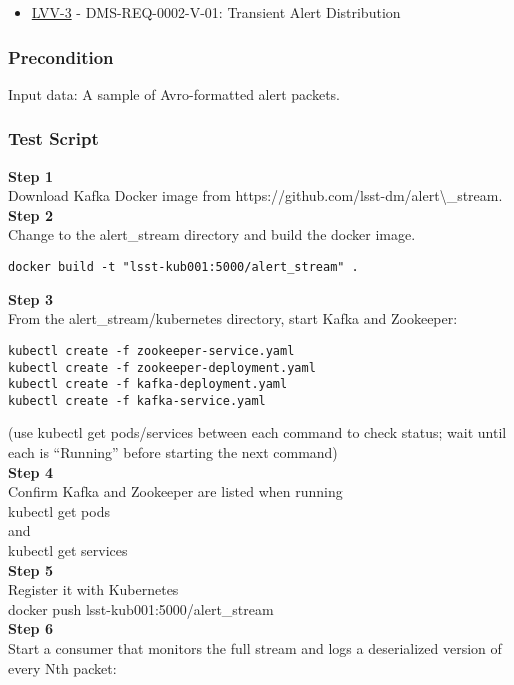 \begin{itemize}
\tightlist
\item
  \href{https://jira.lsstcorp.org/browse/LVV-3}{LVV-3} -
  DMS-REQ-0002-V-01: Transient Alert Distribution
\end{itemize}

\subsubsection{Precondition}\label{precondition-6}

Input data: A sample of Avro-formatted alert packets.

\subsubsection{Test Script}\label{test-script-7}

\textbf{Step 1}\\
Download Kafka Docker image from
https://github.com/lsst-dm/alert\textbackslash{}\_stream.\\[2\baselineskip]\textbf{Step
2}\\
Change to the alert\_stream directory and build the docker image.\\

\begin{verbatim}
docker build -t "lsst-kub001:5000/alert_stream" .
\end{verbatim}

\textbf{Step 3}\\
From the alert\_stream/kubernetes directory, start Kafka and
Zookeeper:\\[2\baselineskip]

\begin{verbatim}
kubectl create -f zookeeper-service.yaml
kubectl create -f zookeeper-deployment.yaml
kubectl create -f kafka-deployment.yaml
kubectl create -f kafka-service.yaml
\end{verbatim}

(use kubectl get pods/services between each command to check status;
wait until each is ``Running'' before starting the next
command)\\[4\baselineskip]\textbf{Step 4}\\
Confirm Kafka and Zookeeper are listed when
running\\[2\baselineskip]kubectl get
pods\\[2\baselineskip]and\\[2\baselineskip]kubectl get
services\\[2\baselineskip]\textbf{Step 5}\\
Register it with Kubernetes\\[2\baselineskip]docker push
lsst-kub001:5000/alert\_stream\\[2\baselineskip]\textbf{Step 6}\\
Start a consumer that monitors the full stream and logs a deserialized
version of every Nth packet:\\

